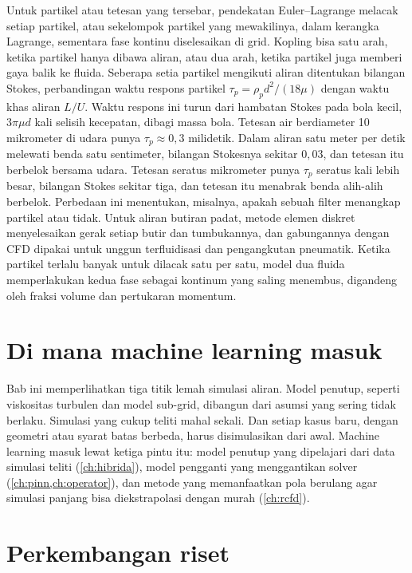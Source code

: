 Untuk partikel atau tetesan yang tersebar, pendekatan Euler--Lagrange melacak setiap partikel, atau
sekelompok partikel yang mewakilinya, dalam kerangka Lagrange, sementara fase kontinu diselesaikan di
grid. Kopling bisa satu arah, ketika partikel hanya dibawa aliran, atau dua arah, ketika partikel
juga memberi gaya balik ke fluida. Seberapa setia partikel mengikuti aliran ditentukan bilangan Stokes,
perbandingan waktu respons partikel $\tau_p=\rho_pd^2/(18\mu)$ dengan waktu khas aliran $L/U$. Waktu respons ini
turun dari hambatan Stokes pada bola kecil, $3\pi\mu d$ kali selisih kecepatan, dibagi massa bola. Tetesan air
berdiameter 10 mikrometer di udara punya $\tau_p\approx0{,}3$ milidetik. Dalam aliran satu meter per detik
melewati benda satu sentimeter, bilangan Stokesnya sekitar $0{,}03$, dan tetesan itu berbelok bersama udara.
Tetesan seratus mikrometer punya $\tau_p$ seratus kali lebih besar, bilangan Stokes sekitar tiga, dan
tetesan itu menabrak benda alih-alih berbelok. Perbedaan ini menentukan, misalnya, apakah sebuah filter
menangkap partikel atau tidak. Untuk aliran butiran padat, metode elemen diskret \citep{cundall1979}
menyelesaikan gerak setiap butir dan tumbukannya, dan gabungannya dengan CFD dipakai untuk unggun
terfluidisasi dan pengangkutan pneumatik. Ketika partikel terlalu banyak untuk dilacak satu per satu,
model dua fluida memperlakukan kedua fase sebagai kontinum yang saling menembus, digandeng oleh fraksi
volume dan pertukaran momentum.

\section{Di mana machine learning masuk}

Bab ini memperlihatkan tiga titik lemah simulasi aliran. Model penutup, seperti viskositas turbulen
dan model sub-grid, dibangun dari asumsi yang sering tidak berlaku. Simulasi yang cukup teliti mahal
sekali. Dan setiap kasus baru, dengan geometri atau syarat batas berbeda, harus disimulasikan dari awal.
Machine learning masuk lewat ketiga pintu itu: model penutup yang dipelajari dari data simulasi teliti
(\cref{ch:hibrida}), model pengganti yang menggantikan solver (\cref{ch:pinn,ch:operator}), dan metode
yang memanfaatkan pola berulang agar simulasi panjang bisa diekstrapolasi dengan murah (\cref{ch:rcfd}).

\section{Perkembangan riset}

